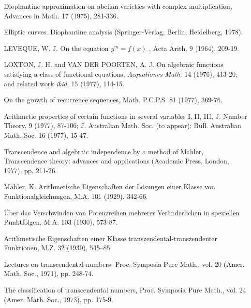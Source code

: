 \begin{hanglist}
    \item Diophantine approximation on abelian varieties with complex multiplication, Advances in Math. 17 (1975), 281-336.
    \item Elliptic curves. Diophantine analysis (Springer-Verlag, Berlin, Heidelberg, 1978).
    \item LEVEQUE, W. J. On the equation  $y^m = f(x)$ , Acta Arith. 9 (1964), 209-19.
    \item LOXTON, J. H. and VAN DER POORTEN, A. J. On algebraic functions satisfying a class of functional equations, \textit{Aequationes Math.} 14 (1976), 413-20; and related work \textit{ibid.} 15 (1977), 114-15.
    \item \hspace{1.5em} On the growth of recurrence sequences, Math. P.C.P.S. 81 (1977), 369-76.
    \item \hspace{1.5em} Arithmetic properties of certain functions in several variables I, II, III, J. Number Theory, 9 (1977), 87-106; J. Australian Math. Soc. (to appear); Bull. Australian Math. Soc. 16 (1977), 15-47.
    \item \hspace{1.5em} Transcendence and algebraic independence by a method of Mahler, Transcendence theory: advances and applications (Academic Press, London, 1977), pp. 211-26.
    \item Mahler, K. Arithmetische Eigenschaften der Lösungen einer Klasse von Funktionalgleichungen, M.A. 101 (1929), 342-66.
    \item \hspace{1.5em} Über das Verschwinden von Potenzreihen mehrerer Veränderlichen in speziellen Punktfolgen, M.A. 103 (1930), 573-87.
    \item \hspace{1.5em} Arithmetische Eigenschaften einer Klasse transzendental-transzendenter Funktionen, M.Z. 32 (1930), 545–85.
    \item \hspace{1.5em} Lectures on transcendental numbers, Proc. Symposia Pure Math., vol. 20 (Amer. Math. Soc., 1971), pp. 248-74.
    \item \hspace{1.5em} The classification of transcendental numbers, Proc. Symposia Pure Math., vol. 24 (Amer. Math. Soc., 1973), pp. 175-9.

\end{hanglist}
